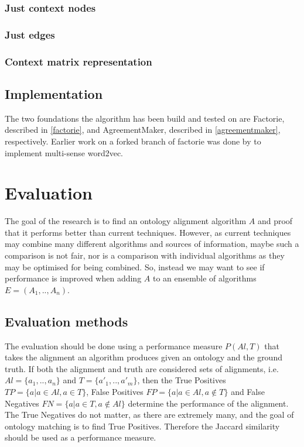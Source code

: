 \documentclass{article}
\begin{document}
  \subsubsection{Just context nodes}
  
  \subsubsection{Just edges}
  
  \subsubsection{Context matrix representation}
  
 \subsection{Implementation}
 The two foundations the algorithm has been build and tested on are Factorie, described in \ref{factorie}, and AgreementMaker, described in \ref{agreementmaker}, respectively. Earlier work on a forked branch of factorie was done by \cite{multisensecode} to implement multi-sense word2vec.
 
 
 \newpage
 \section{Evaluation}
 The goal of the research is to find an ontology alignment algorithm $A$ and proof that it performs better than current techniques. However, as current techniques may combine many different algorithms and sources of information, maybe such a comparison is not fair, nor is a comparison with individual algorithms as they may be optimised for being combined. So, instead we may want to see if performance is improved when adding $A$ to an ensemble of algorithms $E=(A_1,..,A_n)$.
 \subsection{Evaluation methods} \label{Evaluation methods}
 The evaluation should be done using a performance measure $P(Al,T)$ that takes the alignment an algorithm produces given an ontology and the ground truth. If both the alignment and truth are considered sets of alignments, i.e. $Al=\{a_1,..,a_n\}$ and $T=\{a'_1,..,a'_m\}$, then the True Positives $TP=\{a|a\in Al, a\in T\}$, False Positives $FP=\{a|a\in Al, a\notin T\}$ and False Negatives $FN=\{a|a\in T, a\notin Al\}$ determine the performance of the alignment. The True Negatives do not matter, as there are extremely many, and the goal of ontology matching is to find True Positives. Therefore the Jaccard similarity should be used as a performance measure.
 
\end{document}
